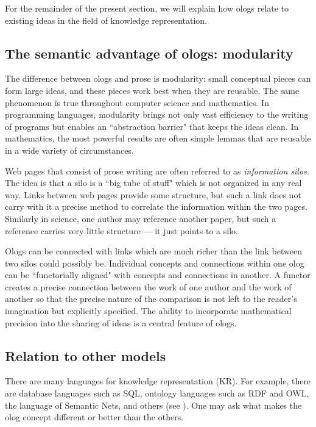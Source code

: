 \documentclass{amsart}
\theoremstyle{remark}
\theoremstyle{definition}
\begin{document}
For the remainder of the present section, we will explain how ologs relate to existing ideas in the field of knowledge representation.

\subsection{The semantic advantage of ologs: modularity}

The difference between ologs and prose is modularity: small conceptual pieces can form large ideas, and these pieces work best when they are reusable. The same phenomenon is true throughout computer science and mathematics. In programming languages, modularity brings not only vast efficiency to the writing of programs but enables an ``abstraction barrier" that keeps the ideas clean. In mathematics, the most powerful results are often simple lemmas that are reusable in a wide variety of circumstances. 

Web pages that consist of prose writing are often referred to as {\em information silos.}  The idea is that a silo is a ``big tube of stuff" which is not organized in any real way. Links between web pages provide some structure, but such a link does not carry with it a precise method to correlate the information within the two pages. Similarly in science, one author may reference another paper, but such a reference carries very little structure --- it just points to a silo.   

Ologs can be connected with links which are much richer than the link between two silos could possibly be. Individual concepts and connections within one olog can be ``functorially aligned" with concepts and connections in another. A functor creates a precise connection between the work of one author and the work of another so that the precise nature of the comparison is not left to the reader's imagination but explicitly specified. The ability to incorporate mathematical precision into the sharing of ideas is a central feature of ologs.

\subsection{Relation to other models}

There are many languages for knowledge representation (KR). For example, there are database languages such as SQL, ontology languages such as RDF and OWL, the language of Semantic Nets, and others (see \cite{Bor}). One may ask what makes the olog concept different or better than the others. 
\end{document}
